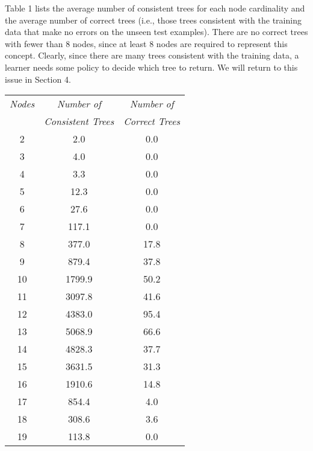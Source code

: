 Table 1 lists the average number of consistent trees for each node
cardinality and the average number of correct trees (i.e., those
trees consistent with the training data that make no errors on the
unseen test examples).  There are no correct trees with fewer
than 8 nodes, since at least 8 nodes are required to represent this
concept.  Clearly, since there are many trees consistent
with the training data, a learner needs some policy to decide which
tree to return.  We will return to this issue in Section 4.

\vspace{0.7cm}
\hspace{3.3cm}
\begin{tabular}{||c|c|c||} \hline
{\it Nodes} & {\it Number of}        & {\it Number of}\\
& {\it Consistent Trees} & {\it Correct Trees}\\ \hline
2           &    2.0                 &  0.0 \\ \hline
3           &    4.0                 &  0.0 \\ \hline
4           &    3.3                 &  0.0 \\ \hline
5           &   12.3                 &  0.0 \\ \hline
6           &   27.6                 &  0.0 \\ \hline
7           &  117.1                 &  0.0 \\ \hline
8           &  377.0                 & 17.8 \\ \hline
9           &  879.4                 & 37.8 \\ \hline
10          & 1799.9                 & 50.2 \\ \hline
11          & 3097.8                 & 41.6 \\ \hline
12          & 4383.0                 & 95.4 \\ \hline
13          & 5068.9                 & 66.6 \\ \hline
14          & 4828.3                 & 37.7 \\ \hline
15          & 3631.5                 & 31.3 \\ \hline
16          & 1910.6                 & 14.8 \\ \hline
17          &  854.4                 &  4.0 \\ \hline
18          &  308.6                 &  3.6 \\ \hline
19          &  113.8                 &  0.0 \\ \hline
\end{tabular}\\

